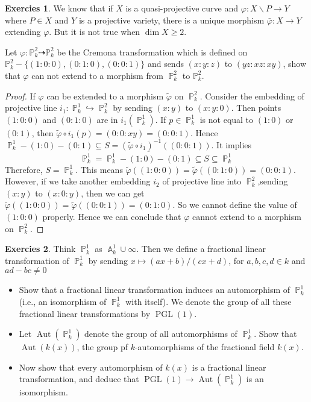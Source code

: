 \documentclass[12pt,a4paper]{article}
\theoremstyle{definition}
\newtheorem{exer}{Exercies}[section]
\DeclareMathOperator{\pgl}{PGL}
\DeclareMathOperator{\aut}{Aut}
\DeclareMathOperator{\p}{\mathbb{P}}
\DeclareMathOperator{\A}{\mathbb{A}}
\begin{document}
\begin{exer}
	We know that if $X$ is a quasi-projective curve and $\varphi \colon X\backslash P \to Y$ where $P\in X$ and $Y$ is a projective variety, there is a unique morphism $\bar{\varphi} \colon X \to Y$ extending $\varphi$. But it is not true when $\dim X \geq2$.
	
	Let $\varphi \colon \mathbb{P}_k^2 \dashrightarrow \mathbb{P}_k^2$ be the Cremona transformation which is defined on $\mathbb{P}_k^2 -\{(1:0:0),(0:1:0),(0:0:1)\}$ and sends $(x:y:z)$ to $(yz:xz:xy)$, show that $\varphi$ can not extend to a morphism from $\p_k^2$ to $\mathbb{P}_k^2$.
\end{exer}
\begin{proof}
	If $\varphi$ can be extended to a morphism $\tilde{\varphi}$ on $\p_k^2$. Consider the embedding of projective line $i_1 \colon \p_k^1 \hookrightarrow \p_k^2$ by sending $(x:y)$ to $(x:y:0)$. Then points $(1:0:0)$ and $(0:1:0)$ are in $i_1(\p_k^1)$. If $p \in \p_k^1$ is not equal to $(1:0)$ or $(0:1)$, then $\tilde{\varphi}\circ i_1(p) = (0:0:xy)=(0:0:1)$. Hence $\p_k^1 -(1:0)-(0:1) \subseteq S= (\tilde{\varphi}\circ i_1)^{-1}((0:0:1))$. It implies
	\[
	\p_k^1= \overline{\p_k^1-(1:0)-(0:1)} \subseteq S \subseteq \p_k^1
	\]
	Therefore, $S= \p_k^1$. This means $\tilde{\varphi}((1:0:0))= \tilde{\varphi}((0:1:0)) = (0:0:1)$. However, if we take another embedding $i_2$ of projective line into $\p_k^2$,sending $(x:y)$ to $(x:0:y)$, then we can get $\tilde{\varphi}((1:0:0))=\tilde{\varphi}((0:0:1)) = (0:1:0)$. So we cannot define the value of $(1:0:0)$ properly. Hence we can conclude that $\varphi$ cannot extend to a morphism on $\p_k^2$.
\end{proof}
\begin{exer}
	Think $\p_k^1$ as $\A_k^1 \cup \infty$. Then we define a fractional linear transformation of $\p_k^1$ by sending $x \mapsto (ax+b)/(cx+d)$, for $a,b,c,d \in k$ and $ad-bc\neq0$
	\begin{itemize}
		\item Show that a fractional linear transformation induces an automorphism of $\p^1_k$ (i.e., an isomorphism of $\p_k^1$ with itself). We denote the group of all these fractional linear transformations by $\pgl(1)$.
		\item Let $\aut(\p_k^1)$ denote the group of all automorphisms of $\p_k^1$. Show that $\aut(k(x))$, the group pf $k$-automorphisms of the fractional field $k(x)$.
		\item Now show that every automorphism of $k(x)$ is a fractional linear transformation, and deduce that $\pgl(1) \to \aut(\p_k^1)$ is an isomorphism.
	\end{itemize}
\end{exer}
\end{document}
